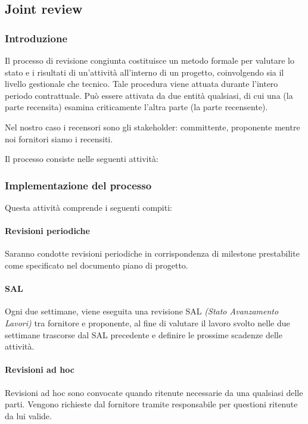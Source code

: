 \subsection{Joint review} 

\subsubsection{Introduzione}
Il processo di revisione congiunta costituisce un metodo formale per valutare lo stato e i risultati di un'attività all'interno di un progetto, coinvolgendo sia il livello gestionale che tecnico. Tale procedura viene attuata durante l'intero periodo contrattuale. Può essere attivata da due entità qualsiasi, di cui una (la parte recensita) esamina criticamente l'altra parte (la parte recensente).

Nel nostro caso i recensori sono gli stakeholder: committente, proponente mentre noi fornitori siamo i recensiti.

Il processo consiste nelle seguenti attività:

\subsubsection{Implementazione del processo}
Questa attività comprende i seguenti compiti:

\paragraph{Revisioni periodiche}
Saranno condotte revisioni periodiche in corrispondenza di milestone prestabilite come specificato nel documento piano di progetto.

\paragraph{SAL}
Ogni due settimane, viene eseguita una revisione SAL \textit{(Stato Avanzamento Lavori)} tra fornitore e proponente, al fine di valutare il lavoro svolto nelle due settimane trascorse dal SAL precedente e definire le prossime scadenze delle attività.

\paragraph{Revisioni ad hoc}
Revisioni ad hoc sono convocate quando ritenute necessarie da una qualsiasi delle parti.
Vengono richieste dal fornitore tramite responsabile per questioni ritenute da lui valide.

